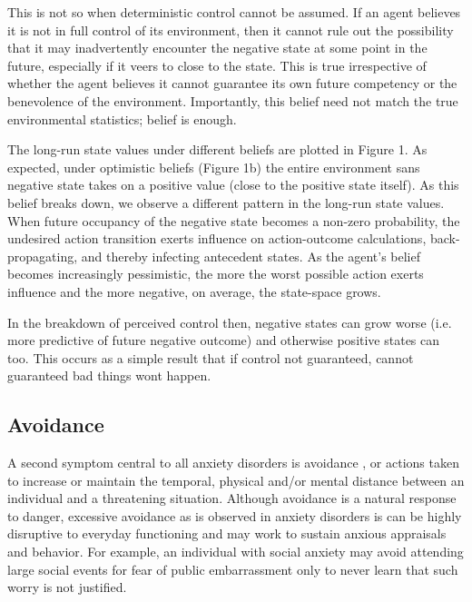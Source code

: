 \documentclass[11pt]{article} %
\begin{document}
This is not so when deterministic control cannot be assumed. If an agent believes
it is not in full control of its environment, then it cannot rule out the possibility
that it may inadvertently encounter the negative state at some point in the future,
especially if it veers to close to the state. This is true irrespective of whether
the agent believes it cannot guarantee its own future competency or the benevolence
of the environment. Importantly, this belief need not match the true environmental
statistics; belief is enough.

The long-run state values under different beliefs are plotted in Figure 1. As
expected, under optimistic beliefs (Figure 1b) the entire environment sans negative
state takes on a positive value (close to the positive state itself). As this belief
breaks down, we observe a different pattern in the long-run state values. When
future occupancy of the negative state becomes a non-zero probability, the undesired
action transition exerts influence on action-outcome calculations, back-propagating,
and thereby infecting antecedent states. As the agent's belief becomes increasingly
pessimistic, the more the worst possible action exerts influence and the more
negative, on average, the state-space grows.

In the breakdown of perceived control then, negative states can grow worse (i.e.
more predictive of future negative outcome) and otherwise positive states can too.
This occurs as a simple result that if control not guaranteed, cannot guaranteed
bad things wont happen.


\subsection{Avoidance}

A second symptom central to all anxiety disorders is avoidance \citep{dsm5,
Krypotos2015, Arnaudova2017}, or actions taken to increase or maintain the temporal,
physical and/or mental distance between an individual and a threatening situation.
Although avoidance is a natural response to danger, excessive avoidance as is
observed in anxiety disorders is can be highly disruptive to everyday functioning
\cite{Salter2004} and may work to sustain anxious appraisals and behavior. For
example, an individual with social anxiety may avoid attending large social events
for fear of public embarrassment only to never learn that such worry is not justified.
\end{document}
